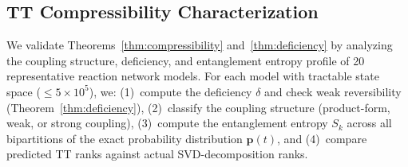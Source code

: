 \documentclass[11pt]{article}
\begin{document}
\subsection{TT Compressibility Characterization}\label{sec:exp:compress-char}

We validate Theorems~\ref{thm:compressibility} and~\ref{thm:deficiency}
by analyzing the coupling structure, deficiency, and entanglement entropy
profile of 20 representative reaction network models.
For each model with tractable state space ($\leq 5\times 10^5$), we:
(1)~compute the deficiency $\delta$ and check weak reversibility
(Theorem~\ref{thm:deficiency}),
(2)~classify the coupling structure (product-form, weak, or strong coupling),
(3)~compute the entanglement entropy $S_k$ across all bipartitions of the
exact probability distribution $\mathbf{p}(t)$, and
(4)~compare predicted TT ranks against actual SVD-decomposition ranks.
\end{document}
